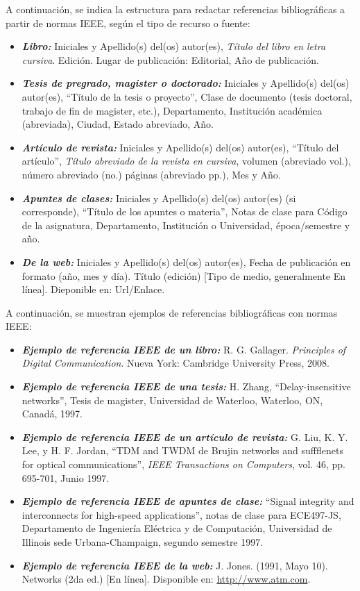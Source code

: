 \documentclass[letterpaper, 10pt, conference]{IEEEtran} %
\begin{document}
	A continuación, se indica la estructura para redactar referencias bibliográficas a partir de normas IEEE, según el tipo de recurso o fuente:
	\begin{itemize}
		\item \textbf{\emph{Libro:}} Iniciales y Apellido(s) del(os) autor(es), \textit{Título del libro en letra cursiva}. Edición. Lugar de publicación: Editorial, Año de publicación.
		\item \textbf{\emph{Tesis de pregrado, magister o doctorado:}} Iniciales y Apellido(s) del(os) autor(es), ``Título de la tesis o proyecto'', Clase de documento (tesis doctoral, trabajo de fin de magister, etc.), Departamento, Institución académica (abreviada), Ciudad, Estado abreviado, Año.
		\item \textbf{\emph{Artículo de revista:}} Iniciales y Apellido(s) del(os) autor(es), ``Título del artículo'', \textit{Título abreviado de la revista en cursiva}, volumen (abreviado vol.), número abreviado (no.) páginas (abreviado pp.), Mes y Año.
		\item \textbf{\emph{Apuntes de clases:}} Iniciales y Apellido(s) del(os) autor(es) (si corresponde), ``Título de los apuntes o materia'', Notas de clase para Código de la asignatura, Departamento, Institución o Universidad, época/semestre y año.
		\item \textbf{\emph{De la web:}} Iniciales y Apellido(s) del(os) autor(es), Fecha de publicación en formato (año, mes y día). Título (edición) [Tipo de medio, generalmente En línea]. Dieponible en: Url/Enlace.
	\end{itemize}
	
	A continuación, se muestran ejemplos de referencias bibliográficas con normas IEEE:
	\begin{itemize}
		\item \textbf{\emph{Ejemplo de referencia IEEE de un libro:}} R. G. Gallager. \textit{Principles of Digital Communication}. Nueva York: Cambridge University Press, 2008.
		\item \textbf{\emph{Ejemplo de referencia IEEE de una tesis:}} H. Zhang, ``Delay-insensitive networks'', Tesis de magister, Universidad de Waterloo, Waterloo, ON, Canadá, 1997.
		\item \textbf{\emph{Ejemplo de referencia IEEE de un artículo de revista:}} G. Liu, K. Y. Lee, y H. F. Jordan, ``TDM and TWDM de Brujin networks and suffflenets for optical communications'', \textit{IEEE Transactions on Computers}, vol. 46, pp. 695-701, Junio 1997.
		\item \textbf{\emph{Ejemplo de referencia IEEE de apuntes de clase:}} ``Signal integrity and interconnects for high-speed applications'', notas de clase para ECE497-JS, Departamento de Ingeniería Eléctrica y de Computación, Universidad de Illinois sede Urbana-Champaign, segundo semestre 1997.
		\item \textbf{\emph{Ejemplo de referencia IEEE de la web:}} J. Jones. (1991, Mayo 10). Networks (2da ed.) [En línea]. Disponible en: \href{http://www.atm.com}{http://www.atm.com}.
	\end{itemize}
	
\end{document}
